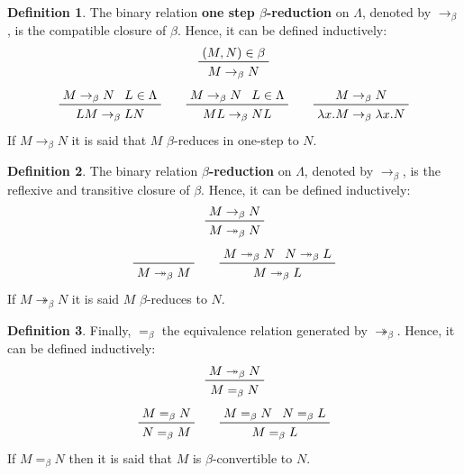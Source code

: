 \documentclass[11pt]{article}
\theoremstyle{definition}
\newtheorem{definition}{Definition}[section]
\theoremstyle{remark}
\theoremstyle{remark}
\theoremstyle{definition}
\begin{document}
\begin{definition}
  The binary relation \textbf{one step $\beta$-reduction} on $\Lambda$, denoted
  by $\rightarrow_\beta$, is the compatible closure of $\beta$. Hence, it can be
  defined inductively:
  \begin{equation*}
    \prftree{(M, N) \in \beta}{M \rightarrow_\beta N}
  \end{equation*}
  \begin{equation*}
    \prftree{M \rightarrow_\beta N}{L \in \Lambda}{LM \rightarrow_\beta LN} \qquad
    \prftree{M \rightarrow_\beta N}{L \in \Lambda}{ML \rightarrow_\beta NL} \qquad
    \prftree{M \rightarrow_\beta N}{\lambda x.M \rightarrow_\beta \lambda x.N}
  \end{equation*}
  If $M \rightarrow_\beta N$ it is said that $M$ $\beta$-reduces in one-step to
  $N$.
\end{definition}

\begin{definition}
  The binary relation \textbf{$\beta$-reduction} on $\Lambda$, denoted by
  $\rightarrow_\beta$, is the reflexive and transitive closure of $\beta$.
  Hence, it can be defined inductively:
  \begin{equation*}
    \prftree{M \rightarrow_\beta N}{M \twoheadrightarrow_\beta N}
  \end{equation*}
  \begin{equation*}
    \prftree{M \twoheadrightarrow_\beta M} \qquad
    \prftree{M \twoheadrightarrow_\beta N}{N \twoheadrightarrow_\beta L}
    {M \twoheadrightarrow_\beta L}
  \end{equation*}
  If $M \twoheadrightarrow_\beta N$ it is said $M$ $\beta$-reduces to $N$.
\end{definition}

\begin{definition}
  Finally, $=_\beta$ the equivalence relation generated by
  $\twoheadrightarrow_\beta$. Hence, it can be defined inductively:
  \begin{equation*}
    \prftree{M \twoheadrightarrow_\beta N}{M =_\beta N}
  \end{equation*}
  \begin{equation*}
    \prftree{M =_\beta N}{N =_\beta M} \qquad
    \prftree{M =_\beta N}{N =_\beta L}{M =_\beta L}
  \end{equation*}
  If $M =_\beta N$ then it is said that $M$ is $\beta$-convertible to $N$.
\end{definition}
\end{document}
